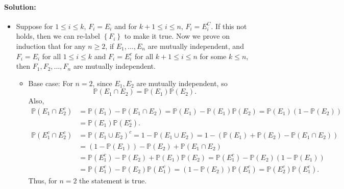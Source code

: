\documentclass[a4paper,12pt]{article}
\begin{document}
\paragraph{Solution:} 
\begin{itemize}
	\item [(a)]	Suppose for \(1 \le i \le k\), \(F_i = E_i\) and for \(k + 1 \le i \le n\), \(F_i = E_i^C\). If this not holds, then we can re-label \(\left\{ F_i \right\} \) to make it true. Now we prove on induction that for any \(n \ge 2\), if \(E_1, \dots , E_n\) are mutually independent, and \(F_i = E_i\) for all \(1 \le i \le k\) and \(F_i = E_i^c\) for all \(k + 1 \le i \le n\) for some \(k \le n\), then \(F_1, F_2, \dots , F_n\) are mutually independent. 
	\begin{itemize}
		\item Base case: For \(n = 2\), since \(E_1, E_2\) are mutually independent, so
		\[
			\mathbb{P} (E_1 \cap E_2) = \mathbb{P} (E_1) \mathbb{P} (E_2).
		\]
		Also, 
		\begin{align*}
			\mathbb{P} (E_1 \cap E_2^c) &= \mathbb{P} (E_1) - \mathbb{P} (E_1 \cap E_2) = \mathbb{P} (E_1) - \mathbb{P} (E_1) \mathbb{P} (E_2) = \mathbb{P} (E_1) (1 - \mathbb{P} (E_2)) \\
			&= \mathbb{P} (E_1) \mathbb{P} (E_2^c). \\
			\mathbb{P} (E_1^c \cap E_2^c) &= \mathbb{P} (E_1 \cup E_2)^c = 1 - \mathbb{P} (E_1 \cup E_2) = 1 - (\mathbb{P} (E_1) + \mathbb{P} (E_2) - \mathbb{P} (E_1 \cap E_2)) \\
			&= (1 - \mathbb{P} (E_1)) - \mathbb{P} (E_2) + \mathbb{P} (E_1 \cap E_2) \\
			&= \mathbb{P} (E_1^c) - \mathbb{P} (E_2) + \mathbb{P} (E_1) \mathbb{P} (E_2) = \mathbb{P} (E_1^c) - \mathbb{P} (E_2) (1 - \mathbb{P} (E_1)) \\
			&= \mathbb{P} (E_1^c) - \mathbb{P} (E_2) \mathbb{P} (E_1^c) = (1 - \mathbb{P} (E_2))\mathbb{P} (E_1^c) = \mathbb{P} (E_2^c) \mathbb{P} (E_1^c).
		\end{align*}
		Thus, for \(n = 2\) the statement is true. 
		

\end{itemize}
\end{itemize}
\end{document}
